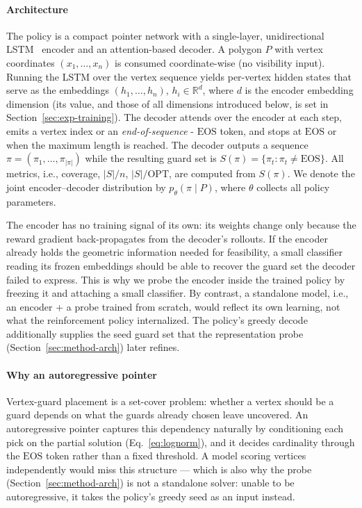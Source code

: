 \documentclass[preprint,10pt]{elsarticle}
\newcommand{\EOS}{\mathrm{EOS}}
\newcommand{\OPT}{\mathrm{OPT}}
\begin{document}
\paragraph{Architecture} The policy is a compact pointer network with a single-layer, unidirectional LSTM~\cite{Hochreiter1997LSTM} encoder and an attention-based decoder. A polygon $P$ with vertex coordinates $(x_1, \dots, x_n)$ is consumed coordinate-wise (no visibility input). Running the LSTM over the vertex sequence yields per-vertex hidden states that serve as the embeddings $(h_1, \dots, h_n)$, $h_i \in \mathbb{R}^{d}$, where $d$ is the encoder embedding dimension (its value, and those of all dimensions introduced below, is set in Section~\ref{sec:exp-training}). The decoder attends over the encoder at each step, emits a vertex index or an \emph{end-of-sequence} -  $\EOS$ token, and stops at $\EOS$ or when the maximum length is reached. The decoder outputs a sequence $\pi = (\pi_1, \dots, \pi_{|\pi|})$ while the resulting guard set is $S(\pi) = \{\pi_t : \pi_t \ne \EOS\}$. All metrics, i.e., coverage, $|S|/n$, $|S|/\OPT$, are computed from $S(\pi)$. We denote the joint encoder--decoder distribution by $p_\theta(\pi \mid P)$, where $\theta$ collects all policy parameters.

The encoder has no training signal of its own: its weights change only because the reward gradient back-propagates from the decoder's rollouts. If the encoder already holds the geometric information needed for feasibility, a small classifier reading its frozen embeddings should be able to recover the guard set the decoder failed to express. This is why we probe the encoder inside the trained policy by freezing it and attaching a small classifier. By contrast, a standalone model, i.e., an encoder + a probe trained from scratch, would reflect its own learning, not what the reinforcement policy internalized. The policy's greedy decode additionally supplies the seed guard set that the representation probe (Section~\ref{sec:method-arch}) later refines.

\paragraph{Why an autoregressive pointer} Vertex-guard placement is a set-cover problem: whether a vertex should be a guard depends on what the guards already chosen leave uncovered. An autoregressive pointer captures this dependency naturally by conditioning each pick on the partial solution (Eq.~\eqref{eq:lognorm}), and it decides cardinality through the $\EOS$ token rather than a fixed threshold. A model scoring vertices independently would miss this structure --- which is also why the probe (Section~\ref{sec:method-arch}) is not a standalone solver: unable to be autoregressive, it takes the policy's greedy seed as an input instead.
\end{document}

